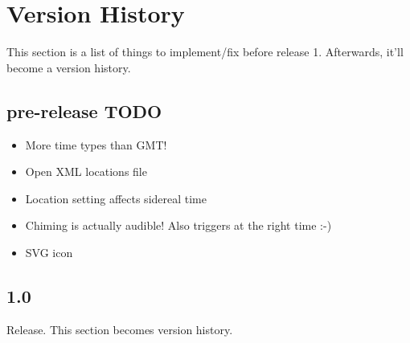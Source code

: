 \section{Version History}

This section is a list of things to implement/fix before release 1. Afterwards, it'll become a version history.

\subsection{pre-release TODO}
\begin{itemize}
    \item More time types than GMT!
    \item Open XML locations file
    \item Location setting affects sidereal time
    \item Chiming is actually audible! Also triggers at the right time :-)
    \item SVG icon
\end{itemize}
\subsection{1.0}

Release. This section becomes version history.

